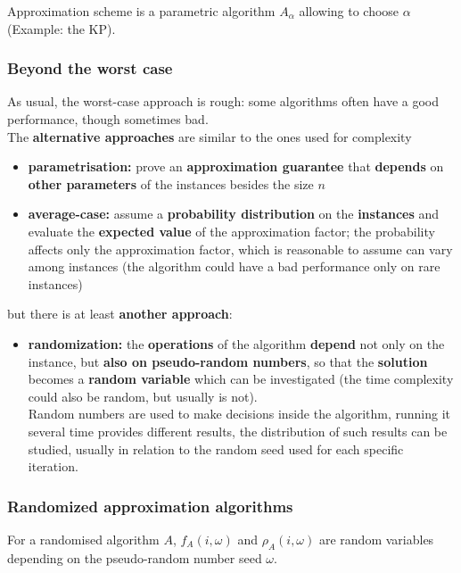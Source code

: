 \documentclass[11pt]{article}
\begin{document}
	Approximation scheme is a parametric algorithm $A_\alpha$ allowing to choose $\alpha$ (Example: the KP).\\
	
	\newpage
	
	\subsubsection{Beyond the worst case}
	As usual, the worst-case approach is rough: some algorithms often have a good performance, though sometimes bad.\\
	
	The \textbf{alternative approaches} are similar to the ones used for complexity
	\begin{itemize}
		\item \textbf{parametrisation:} prove an \textbf{approximation guarantee} that \textbf{depends} on \textbf{other parameters} of the instances besides the size $n$
		\item \textbf{average-case:} assume a \textbf{probability distribution} on the \textbf{instances} and evaluate the \textbf{expected value} of the approximation factor; the probability affects only the approximation factor, which is reasonable to assume can vary among instances (the algorithm could have a bad performance only on rare instances)
	\end{itemize}
	
	but there is at least \textbf{another approach}: 
	\begin{itemize}
		\item \textbf{randomization:} the \textbf{operations} of the algorithm \textbf{depend} not only on the instance, but \textbf{also on pseudo-random numbers}, so that the \textbf{solution} becomes a \textbf{random variable} which can be investigated (the time complexity could also be random, but usually is not).\\ 
		Random numbers are used to make decisions inside the algorithm, running it several time provides different results, the distribution of such results can be studied, usually in relation to the random seed used for each specific iteration. \\
	\end{itemize}
	
	\newpage
	
	\subsubsection{Randomized approximation algorithms}
	For a randomised algorithm $A$, $f_A (i , \omega)$ and $\rho_A (i , \omega)$ are random variables depending on the pseudo-random number seed $\omega$.\\
	
\end{document}
